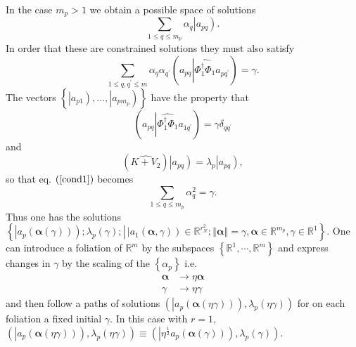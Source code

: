 \documentclass[aps,preprint]{revtex4}%
\begin{document}
In the case $m_{p}>1$ we obtain a possible space of solutions
\begin{equation}
\sum_{1\leq q\leq m_{p}}\alpha_{q}\left\vert \overset{}{a_{pq}}\right)  .
\end{equation}
In order that these are constrained solutions they must also satisfy
\begin{equation}
\sum_{1\leq q,q^{\prime}\leq m}\alpha_{q}\alpha_{q^{\prime}}\left(
\overset{}{a_{pq}}\left\vert \widehat{\Phi_{1}^{\dagger}\Phi_{1}}\right.
\overset{}{a_{pq^{\prime}}}\right)  =\gamma. \label{cond1}%
\end{equation}
The vectors $\left\{  \left\vert \overset{}{a_{p1}}\right)  ,\ldots,\left\vert
\overset{}{a_{pm_{p}}}\right)  \right\}  $ have the property that
\begin{equation}
\left(  \overset{}{a_{pq}}\left\vert \widehat{\Phi_{1}^{\dagger}\Phi_{1}%
}\right.  \overset{}{a_{1q^{\prime}}}\right)  =\gamma\delta_{qq^{\prime}}%
\end{equation}
and
\begin{equation}
\left(  \widehat{K+V_{2}}\right)  \left\vert \overset{}{a_{pq}}\right)
=\lambda_{p}\left\vert \overset{}{a_{pq}}\right)  ,
\end{equation}
so that eq. $\left(  \ref{cond1}\right)  $ becomes
\begin{equation}
\sum_{1\leq q\leq m_{p}}\alpha_{q}^{2}=\gamma.
\end{equation}
Thus one has the solutions $\left\{  \left.  \left\vert a_{p}\left(
\mathbf{\alpha}\left(  \gamma\right)  \right)  \right)  ;\lambda_{p}\left(
\gamma\right)  ;\right\vert \,\left\vert a_{1}\left(  \mathbf{\alpha}%
,\gamma\right)  \right)  \in\mathbb{R}^{r_{N}^{2}};\left\Vert \mathbf{\alpha
}\right\Vert =\gamma,\mathbf{\alpha\in}\mathbb{R}^{m_{p}},\gamma\mathbf{\in
}\mathbb{R}^{1}\right\}  .$ One can introduce a foliation of $\mathbb{R}^{m}$
by the subspaces $\left\{  \mathbb{R}^{1},\cdots,\mathbb{R}^{m}\right\}  $ and
express changes in $\gamma$ by the scaling of the $\left\{  \alpha
_{p}\right\}  $ i.e.
\begin{align}
\mathbf{\alpha}  &  \rightarrow\eta\mathbf{\alpha}\nonumber\\
\gamma &  \rightarrow\eta\gamma
\end{align}
and then follow a paths of solutions $\left(  \left\vert a_{p}\left(
\mathbf{\alpha}\left(  \eta\gamma\right)  \right)  \right)  ,\lambda
_{p}\left(  \eta\gamma\right)  \right)  $ for on each foliation a fixed
initial $\gamma$. In this case with $r=1,$ $\left(  \left\vert a_{p}\left(
\mathbf{\alpha}\left(  \eta\gamma\right)  \right)  \right)  ,\lambda
_{p}\left(  \eta\gamma\right)  \right)  \equiv\left(  \left\vert \eta
^{\frac{1}{2}}a_{p}\left(  \mathbf{\alpha}\left(  \gamma\right)  \right)
\right)  ,\lambda_{p}\left(  \gamma\right)  \right)  .$
\end{document}
